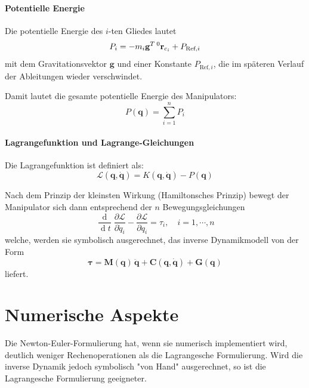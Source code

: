 \documentclass[a4paper, 11pt, accentcolor = tud3b]{tudreport}
\DeclareMathOperator{\total}{d}
\newcommand{\inreferenceto}[2]{\prescript{#1}{}{#2}}
\newcommand{\mat}[1]{\boldsymbol{#1}}
\renewcommand{\vec}[1]{\boldsymbol{\mathbf{#1}}}
\begin{document}
			\paragraph{Potentielle Energie}
				Die potentielle Energie des \(i\)-ten Gliedes lautet
				\begin{equation*}
					P_i = -m_i \vec{g}^T \inreferenceto{0}{\vec{r}}_{c_i} + P_{\text{Ref}, i}
				\end{equation*}
				mit dem Gravitationsvektor \( \vec{g} \) und einer Konstante \( P_{\text{Ref}, i} \), die im späteren Verlauf der Ableitungen wieder verschwindet.
				
				Damit lautet die gesamte potentielle Energie des Manipulators:
				\begin{equation*}
					P(\vec{q}\!) = \sum_{i = 1}^{n} P_i
				\end{equation*}
			
			\paragraph{Lagrangefunktion und Lagrange-Gleichungen}
				Die Lagrangefunktion ist definiert als:
				\begin{equation*}
					\mathcal{L}(\vec{q}, \dot{\vec{q}}\!) = K(\vec{q}, \dot{\vec{q}}\!) - P(\vec{q}\!)
				\end{equation*}
				
				Nach dem Prinzip der kleinsten Wirkung (Hamiltonsches Prinzip) bewegt der Manipulator sich dann entsprechend der \(n\) Bewegungsgleichungen
				\begin{equation*}
					\frac{\total}{\total t} \frac{\partial \mathcal{L}}{\partial \dot{q}_i} - \frac{\partial \mathcal{L}}{\partial q_i} = \tau_i,\quad i = 1, \cdots, n
				\end{equation*}
				welche, werden sie symbolisch ausgerechnet, das inverse Dynamikmodell von der Form
				\begin{equation*}
					\vec{\tau} = \mat{M}(\vec{q}\!)\, \ddot{\vec{q}} + \vec{C}(\vec{q}, \dot{\vec{q}}\!) + \vec{G}(\vec{q}\!)
				\end{equation*}
				liefert.

		\section{Numerische Aspekte}
			Die Newton-Euler-Formulierung hat, wenn sie numerisch implementiert wird, deutlich weniger Rechenoperationen als die Lagrangesche Formulierung. Wird die inverse Dynamik jedoch symbolisch "von Hand" ausgerechnet, so ist die Lagrangesche Formulierung geeigneter.
\end{document}
